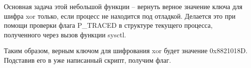 
Основная задача этой небольшой функции – вернуть верное значение ключа для шифра xor только, если процесс не находится под отладкой. Делается это при помощи проверки флага P\_TRACED в структуре текущего процесса, полученного через вызов функции sysctl.

Таким образом, верным ключом для шифрования xor будет значение 0x8821018D. Подставив его в уже написанный скрипт, получим флаг.

